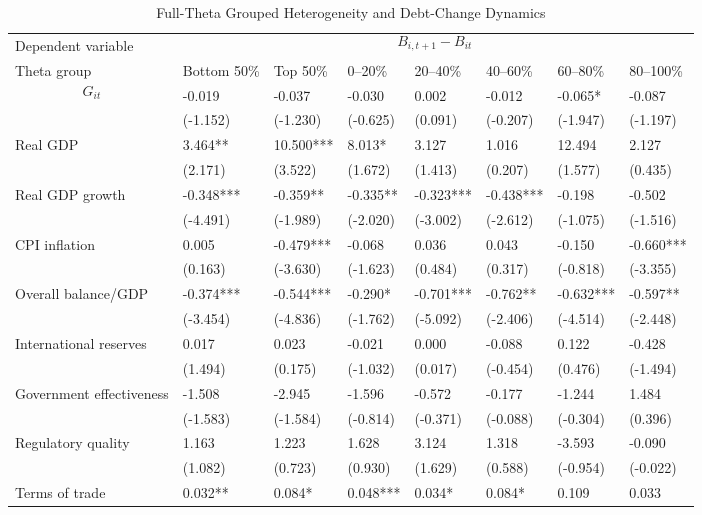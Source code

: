 \begin{table}[H]\centering
\begin{threeparttable}
\caption{Full-Theta Grouped Heterogeneity and Debt-Change Dynamics}
\label{tab:theta_group_heterogeneity_debt}
\scriptsize
\begin{tabularx}{\textwidth}{lYYYYYYY}
\toprule
Dependent variable &  \\
\cmidrule(lr){2-8}
Theta group & Bottom 50\% & Top 50\% & 0--20\% & 20--40\% & 40--60\% & 60--80\% & 80--100\% \\
\midrule
$$G_{it}$$ & -0.019 & -0.037 & -0.030 & 0.002 & -0.012 & -0.065* & -0.087 \\
  & (-1.152) & (-1.230) & (-0.625) & (0.091) & (-0.207) & (-1.947) & (-1.197) \\
Real GDP & 3.464** & 10.500*** & 8.013* & 3.127 & 1.016 & 12.494 & 2.127 \\
  & (2.171) & (3.522) & (1.672) & (1.413) & (0.207) & (1.577) & (0.435) \\
Real GDP growth & -0.348*** & -0.359** & -0.335** & -0.323*** & -0.438*** & -0.198 & -0.502 \\
  & (-4.491) & (-1.989) & (-2.020) & (-3.002) & (-2.612) & (-1.075) & (-1.516) \\
CPI inflation & 0.005 & -0.479*** & -0.068 & 0.036 & 0.043 & -0.150 & -0.660*** \\
  & (0.163) & (-3.630) & (-1.623) & (0.484) & (0.317) & (-0.818) & (-3.355) \\
Overall balance/GDP & -0.374*** & -0.544*** & -0.290* & -0.701*** & -0.762** & -0.632*** & -0.597** \\
  & (-3.454) & (-4.836) & (-1.762) & (-5.092) & (-2.406) & (-4.514) & (-2.448) \\
International reserves & 0.017 & 0.023 & -0.021 & 0.000 & -0.088 & 0.122 & -0.428 \\
  & (1.494) & (0.175) & (-1.032) & (0.017) & (-0.454) & (0.476) & (-1.494) \\
Government effectiveness & -1.508 & -2.945 & -1.596 & -0.572 & -0.177 & -1.244 & 1.484 \\
  & (-1.583) & (-1.584) & (-0.814) & (-0.371) & (-0.088) & (-0.304) & (0.396) \\
Regulatory quality & 1.163 & 1.223 & 1.628 & 3.124 & 1.318 & -3.593 & -0.090 \\
  & (1.082) & (0.723) & (0.930) & (1.629) & (0.588) & (-0.954) & (-0.022) \\
Terms of trade & 0.032** & 0.084* & 0.048*** & 0.034* & 0.084* & 0.109 & 0.033 \\

\end{tabularx}
\end{threeparttable}
\end{table}
